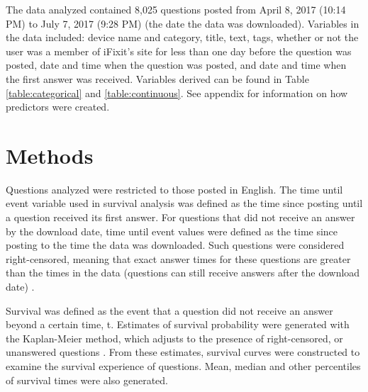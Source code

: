 \documentclass{article}
\begin{document}
The data analyzed contained 8,025 questions posted from April 8, 2017 (10:14 PM) to July 7, 2017 (9:28 PM) (the date the data was downloaded). Variables in the data included: device name and category, title, text, tags, whether or not the user was a member of iFixit's site for less than one day before the question was posted, date and time when the question was posted, and date and time when the first answer was received. Variables derived can be found in Table \ref{table:categorical} and \ref{table:continuous}. See appendix for information on how predictors were created. 


\section*{Methods}

Questions analyzed were restricted to those posted in English. The time until event variable used in survival analysis was defined as the time since posting until a question received its first answer. For questions that did not receive an answer by the download date, time until event values were defined as the time since posting to the time the data was downloaded. Such questions were considered right-censored, meaning that exact answer times for these questions are greater than the times in the data (questions can still receive answers after the download date) \cite{Kleinbaum2011}. 

Survival was defined as the event that a question did not receive an answer beyond a certain time, t. Estimates of survival probability were generated with the Kaplan-Meier method, which adjusts to the presence of right-censored, or unanswered questions \cite{Bland1998}. From these estimates, survival curves were constructed to examine the survival experience of questions. Mean, median and other percentiles of survival times were also generated. 
\end{document}
